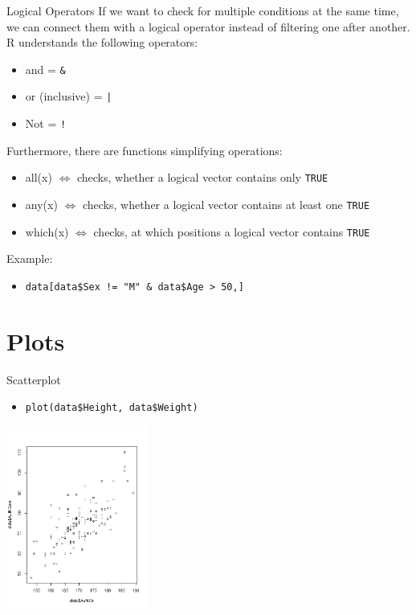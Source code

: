 \documentclass[aspectratio = 169]{chariteBeamer}
\begin{document}
\begin{frame}[fragile]{Logical Operators}
If we want to check for multiple conditions at the same time, we can connect them with a logical operator instead of filtering one after another. R understands the following operators:\\
\begin{itemize}
			\item  and = \verb+&+
			\item  or (inclusive) = \verb+|+
			\item Not = \verb+!+
\end{itemize}
Furthermore, there are functions simplifying operations:\\
\begin{itemize}
			\item all(x) $\Leftrightarrow$ checks, whether a logical vector contains only \verb+TRUE+ 
			\item any(x) $\Leftrightarrow$ checks, whether a logical vector contains at least one \verb+TRUE+
			\item which(x) $\Leftrightarrow$ checks, at which positions a logical vector contains \verb+TRUE+
\end{itemize}
Example:
	\begin{itemize}
		\item  \verb+data[data$Sex != "M" & data$Age > 50,]+
	\end{itemize}
\end{frame}


\section{Plots}

\begin{frame}[fragile]{Scatterplot}
	\begin{itemize}
		\item \verb+plot(data$Height, data$Weight)+
	\end{itemize}
			
	\begin{center}
		\includegraphics[height=6cm]{Scatterplot}
	\end{center}
\end{frame}
\end{document}
